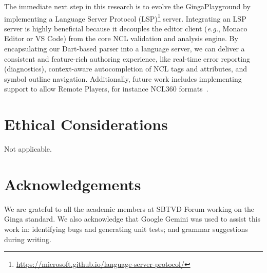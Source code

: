 \documentclass[sigconf]{webmedia}
\begin{document}
The immediate next step in this research is to evolve the GingaPlayground by implementing a Language Server Protocol (LSP)\footnote{\url{https://microsoft.github.io/language-server-protocol/}} server. Integrating an LSP server is highly beneficial because it decouples the editor client (\textit{e.g.}, Monaco Editor or VS Code) from the core NCL validation and analysis engine. By encapsulating our Dart-based parser into a language server, we can deliver a consistent and feature-rich authoring experience, like real-time error reporting (diagnostics), context-aware autocompletion of NCL tags and attributes, and symbol outline navigation. Additionally, future work includes implementing support to allow Remote Players, for instance NCL360 formats~\cite{souza2020ncl360}.

\vspace{-0.3em}
\section*{Ethical Considerations}
\vspace{-0.3em}
Not applicable.

\vspace{-0.5em}
\section*{Acknowledgements}
\vspace{-0.3em}
We are grateful to all the academic members at SBTVD Forum working on the Ginga standard. We also acknowledge that Google Gemini was used to assist this work in: identifying bugs and generating unit tests; and grammar suggestions during writing.



\end{document}

